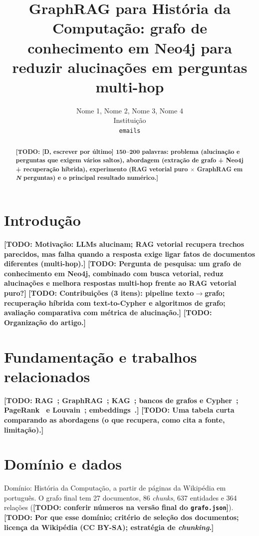 \documentclass[12pt]{article}
\title{GraphRAG para História da Computação: grafo de conhecimento em Neo4j para reduzir alucinações em perguntas multi-hop}
\author{Nome 1, Nome 2, Nome 3, Nome 4 \\ Instituição \\ \texttt{emails}}
\date{}
\newcommand{\todo}[1]{\textbf{[TODO: #1]}}
\begin{document}
\maketitle

\begin{abstract}
\todo{[D, escrever por último] 150--200 palavras: problema (alucinação e perguntas que exigem vários saltos),
abordagem (extração de grafo + Neo4j + recuperação híbrida), experimento (RAG vetorial puro $\times$ GraphRAG em
\emph{N} perguntas) e o principal resultado numérico.}
\end{abstract}

\section{Introdução} %
\todo{Motivação: LLMs alucinam; RAG vetorial recupera trechos parecidos, mas falha quando a resposta exige
ligar fatos de documentos diferentes (multi-hop).}
\todo{Pergunta de pesquisa: um grafo de conhecimento em Neo4j, combinado com busca vetorial, reduz alucinações e
melhora respostas multi-hop frente ao RAG vetorial puro?}
\todo{Contribuições (3 itens): pipeline texto$\to$grafo; recuperação híbrida com text-to-Cypher e algoritmos de grafo;
avaliação comparativa com métrica de alucinação.}
\todo{Organização do artigo.}

\section{Fundamentação e trabalhos relacionados} %
\todo{RAG~\cite{lewis2020rag}; GraphRAG~\cite{edge2024graphrag}; KAG~\cite{liang2024kag};
bancos de grafos e Cypher~\cite{robinson2015graph,francis2018cypher}; PageRank~\cite{page1999pagerank} e
Louvain~\cite{blondel2008louvain}; embeddings~\cite{reimers2019sbert}.}
\todo{Uma tabela curta comparando as abordagens (o que recupera, como cita a fonte, limitação).}

\section{Domínio e dados} %
Domínio: História da Computação, a partir de páginas da Wikipédia em português.
O grafo final tem 27 documentos, 86 \emph{chunks}, 637 entidades e 364 relações
(\todo{conferir números na versão final do \texttt{grafo.json}}).
\todo{Por que esse domínio; critério de seleção dos documentos; licença da Wikipédia (CC BY-SA); estratégia de \emph{chunking}.}
\end{document}
